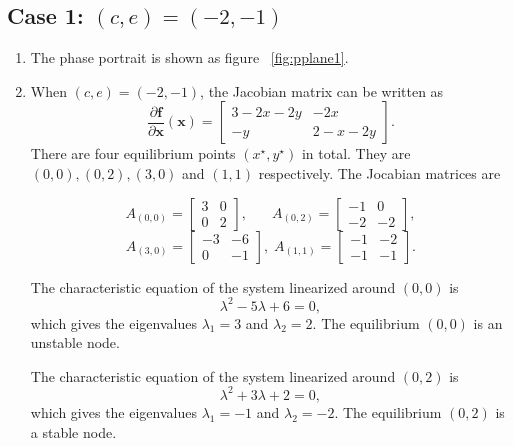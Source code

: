 \subsection*{Case 1: $(c,e)=(-2,-1)$}
\begin{enumerate}
\item The phase portrait is shown as figure ~\ref{fig:pplane1}.
\item When $(c,e)=(-2,-1)$, the Jacobian matrix can be written as
\begin{equation*}
    \frac{\partial\textbf{f}}{\partial \textbf{x}}(\textbf{x}) =
    \left[\begin{array}{cc}
    3-2x-2y & -2x \\
    -y & 2-x-2y
    \end{array}\right].
\end{equation*}
There are four equilibrium points $(x^\star,y^\star)$ in total. They are $(0,0),(0,2),(3,0)$ and $(1,1)$ respectively. The Jocabian matrices are

\begin{equation*}
    A_{(0,0)} =
    \left[\begin{array}{cc}
    3 & 0 \\
    0 & 2
    \end{array}\right], \;\;\quad\, A_{(0,2)} =
    \left[\begin{array}{cc}
    -1 & 0 \\
    -2 & -2
    \end{array}\right],   
    \end{equation*}
    \begin{equation*}
    A_{(3,0)} =
    \left[\begin{array}{cc}
    -3 & -6 \\
    0 & -1
    \end{array}\right], \;A_{(1,1)} =
    \left[\begin{array}{cc}
    -1 & -2 \\
    -1 & -1
    \end{array}\right].
\end{equation*}

The characteristic equation of the system linearized around $(0,0)$ is $$\lambda^2 -5 \lambda + 6 = 0,$$ which gives the eigenvalues $\lambda_{1} = 3$ and $\lambda_{2} = 2$. The equilibrium $(0,0)$ is an unstable node. 

The characteristic equation of the system linearized around $(0,2)$ is $$\lambda^2 +3 \lambda + 2 = 0,$$ which gives the eigenvalues $\lambda_1 = -1$ and $\lambda_2 = -2$. The equilibrium $(0,2)$ is a stable node.
 

\end{enumerate}
